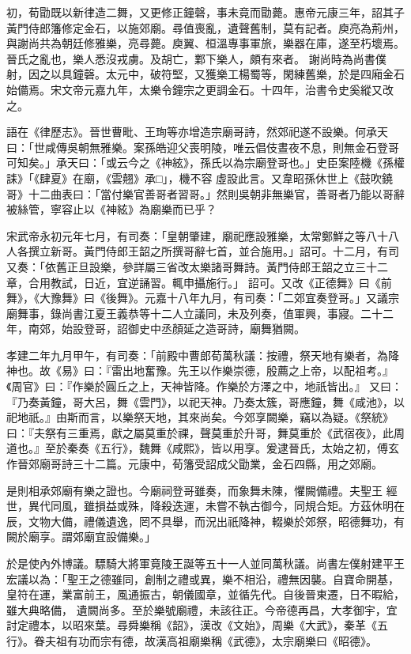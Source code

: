 \begin{pinyinscope}
 初，荀勖既以新律造二舞，又更修正鐘磬，事未竟而勖薨。惠帝元康三年，詔其子黃門侍郎籓修定金石，以施郊廟。尋值喪亂，遺聲舊制，莫有記者。庾亮為荊州，與謝尚共為朝廷修雅樂，亮尋薨。庾翼、桓溫專事軍旅，樂器在庫，遂至朽壞焉。晉氏之亂也，樂人悉沒戎虜。及胡亡，鄴下樂人，頗有來者。
 謝尚時為尚書僕射，因之以具鐘磬。太元中，破符堅，又獲樂工楊蜀等，閑練舊樂，於是四廂金石始備焉。宋文帝元嘉九年，太樂令鐘宗之更調金石。十四年，治書令史奚縱又改之。



 語在《律歷志》。晉世曹毗、王珣等亦增造宗廟哥詩，然郊祀遂不設樂。何承天曰：「世咸傳吳朝無雅樂。案孫皓迎父喪明陵，唯云倡伎晝夜不息，則無金石登哥可知矣。」承天曰：「或云今之《神絃》，孫氏以為宗廟登哥也。」史臣案陸機《孫權誄》「《肆夏》在廟，《雲翹》承□」，機不容
 虛設此言。又韋昭孫休世上《鼓吹鐃哥》十二曲表曰：「當付樂官善哥者習哥。」然則吳朝非無樂官，善哥者乃能以哥辭被絲管，寧容止以《神絃》為廟樂而已乎？



 宋武帝永初元年七月，有司奏：「皇朝肇建，廟祀應設雅樂，太常鄭鮮之等八十八人各撰立新哥。黃門侍郎王韶之所撰哥辭七首，並合施用。」詔可。十二月，有司又奏：「依舊正旦設樂，參詳屬三省改太樂諸哥舞詩。黃門侍郎王韶之立三十二章，合用教試，日近，宜逆誦習。輒申攝施行。」
 詔可。又改《正德舞》曰《前舞》，《大豫舞》曰《後舞》。元嘉十八年九月，有司奏：「二郊宜奏登哥。」又議宗廟舞事，錄尚書江夏王義恭等十二人立議同，未及列奏，值軍興，事寢。二十二年，南郊，始設登哥，詔御史中丞顏延之造哥詩，廟舞猶闕。



 孝建二年九月甲午，有司奏：「前殿中曹郎荀萬秋議：按禮，祭天地有樂者，為降神也。故《易》曰：『雷出地奮豫。先王以作樂崇德，殷薦之上帝，以配祖考。』《周官》曰：『作樂於圓丘之上，天神皆降。作樂於方澤之中，地祇皆出。』
 又曰：『乃奏黃鐘，哥大呂，舞《雲門》，以祀天神。乃奏太簇，哥應鐘，舞《咸池》，以祀地祇。』由斯而言，以樂祭天地，其來尚矣。今郊享闕樂，竊以為疑。《祭統》曰：『夫祭有三重焉，獻之屬莫重於祼，聲莫重於升哥，舞莫重於《武宿夜》，此周道也。』至於秦奏《五行》，魏舞《咸熙》，皆以用享。爰逮晉氏，太始之初，傅玄作晉郊廟哥詩三十二篇。元康中，荀籓受詔成父勖業，金石四縣，用之郊廟。



 是則相承郊廟有樂之證也。今廟祠登哥雖奏，而象舞未陳，懼闕備禮。夫聖王
 經世，異代同風，雖損益或殊，降殺迭運，未嘗不執古御今，同規合矩。方茲休明在辰，文物大備，禮儀遺逸，罔不具舉，而況出祇降神，輟樂於郊祭，昭德舞功，有闕於廟享。謂郊廟宜設備樂。」



 於是使內外博議。驃騎大將軍竟陵王誕等五十一人並同萬秋議。尚書左僕射建平王宏議以為：「聖王之德雖同，創制之禮或異，樂不相沿，禮無因襲。自寶命開基，皇符在運，業富前王，風通振古，朝儀國章，並循先代。自後晉東遷，日不暇給，雖大典略備，
 遺闕尚多。至於樂號廟禮，未該往正。今帝德再昌，大孝御宇，宜討定禮本，以昭來葉。尋舜樂稱《韶》，漢改《文始》，周樂《大武》，秦革《五行》。眷夫祖有功而宗有德，故漢高祖廟樂稱《武德》，太宗廟樂曰《昭德》。




\end{pinyinscope}
